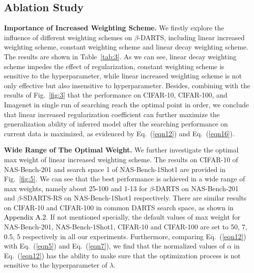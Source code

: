 \documentclass[10pt,twocolumn,letterpaper]{article}
\newcommand{\bp}[1]{\textcolor{black}{#1}}
\begin{document}
\subsection{Ablation Study} 
\noindent\textbf{Importance of Increased Weighting Scheme.} We firstly explore the influence of different weighting schemes on $\beta$-DARTS, including linear increased weighting scheme, constant weighting scheme and linear decay weighting scheme. The results are shown in Table~\ref{tab:3}. As we can see, linear decay weighting scheme impedes the effect of regularization, constant weighting scheme is sensitive to the hyperparameter, while linear increased weighting scheme is not only effective but also insensitive to hyperparameter. Besides, combining with the results of Fig.~\ref{fig:3} that the performance on CIFAR-10, CIFAR-100, and Imagenet in single run of searching reach the optimal point in order, we conclude that linear increased regularization coefficient can further maximize the generalization ability of inferred model after the searching performance on current data is maximized, as evidenced by Eq.~(\ref{eqn12}) and Eq.~(\ref{eqn16}).

\noindent\textbf{Wide Range of The Optimal Weight.} We further investigate the optimal max weight of linear increased weighting scheme. The results on CIFAR-10 of NAS-Bench-201 and search space 1 of NAS-Bench-1Shot1 are provided in Fig.~\ref{fig:5}. We can see that the best performance is achieved in a wide range of max weights, namely about 25-100 and 1-13 for $\beta$-DARTS on NAS-Bench-201 and $\beta$-SDARTS-RS on NAS-Bench-1Shot1 respectively. There are similar results on CIFAR-10 and CIFAR-100 in common DARTS search space, as shown in \bp{Appendix A.2}. If not mentioned specially, the default values of max weight for NAS-Bench-201, NAS-Bench-1Shot1, CIFAR-10 and CIFAR-100 are set to 50, 7, 0.5, 5 respectively in all our experiments. Furthermore, comparing Eq.~(\ref{eqn12}) with Eq.~(\ref{eqn5}) and Eq.~(\ref{eqn7}), we find that the normalized values of $\alpha$ in  Eq.~(\ref{eqn12}) has the ability to make sure that the optimization process is not sensitive to the hyperparameter of $\lambda$.
\end{document}
